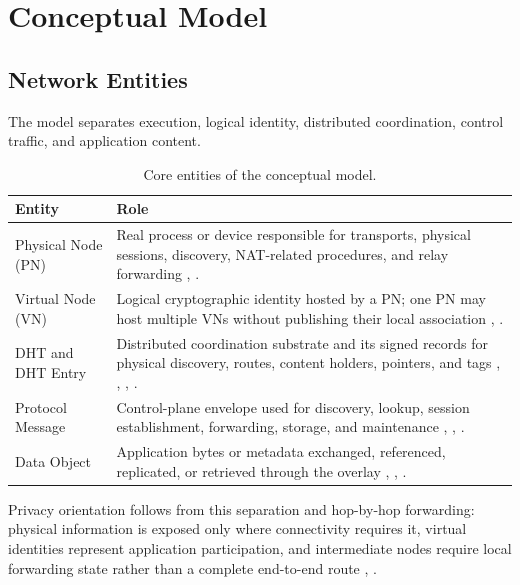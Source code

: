 \documentclass[
  12pt,
  oneside,
  a4paper,
  chapter=TITLE,
  section=TITLE,
  english,
  brazil
]{abntex2}
\begin{document}
\section{Conceptual Model}

\subsection{Network Entities}

The model separates execution, logical identity, distributed coordination, control traffic, and application content.

\begin{table}[H]
\centering
\caption{Core entities of the conceptual model.}
\label{tab:conceptual-entities}
\begin{tabularx}{\textwidth}{L{0.22\textwidth} Y}
\toprule
\textbf{Entity} & \textbf{Role} \\
\midrule
Physical Node (PN) & Real process or device responsible for transports, physical sessions, discovery, NAT-related procedures, and relay forwarding \cite{li2022unreachable}, \cite{augustine2022byzantine}. \\
Virtual Node (VN) & Logical cryptographic identity hosted by a PN; one PN may host multiple VNs without publishing their local association \cite{mirzaei2018pk}, \cite{qian2016garlic}. \\
DHT and DHT Entry & Distributed coordination substrate and its signed records for physical discovery, routes, content holders, pointers, and tags \cite{stoica2001chord}, \cite{maymounkov2002kademlia}, \cite{rowstron2001pastry}, \cite{augustine2022byzantine}. \\
Protocol Message & Control-plane envelope used for discovery, lookup, session establishment, forwarding, storage, and maintenance \cite{li2022unreachable}, \cite{augustine2022byzantine}, \cite{qian2016garlic}. \\
Data Object & Application bytes or metadata exchanged, referenced, replicated, or retrieved through the overlay \cite{augustine2022byzantine}, \cite{mirzaei2018pk}, \cite{qian2016garlic}. \\
\bottomrule
\end{tabularx}
\end{table}

Privacy orientation follows from this separation and hop-by-hop forwarding: physical information is exposed only where connectivity requires it, virtual identities represent application participation, and intermediate nodes require local forwarding state rather than a complete end-to-end route \cite{mirzaei2018pk}, \cite{qian2016garlic}.
\end{document}
